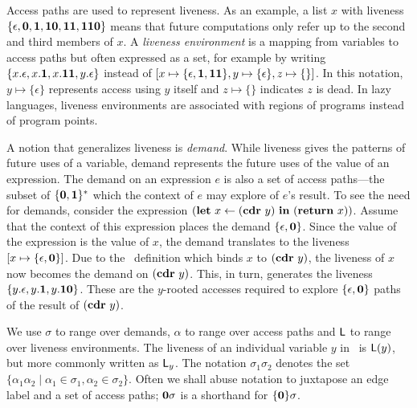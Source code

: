 \documentclass[9pt,nonatbib]{sigplanconf}
\begin{document}
Access paths are used to  represent liveness. As an example, a list
$x$ with 
liveness  $\{\epsilon,  \mathbf{0},  \mathbf{1},  \mathbf{1}\mathbf{0},
\mathbf{1}\mathbf{1},  \mathbf{1}\mathbf{1}\mathbf{0}\}$ means that future computations    only
refer up  to the  second and  third members of  $x$.  A  {\em liveness
  environment} is a mapping from  variables to access paths but often
expressed as  a set,  for example  by writing  $\{x.\epsilon, x.\mathbf{1},
x.\mathbf{1}\mathbf{1},        y.\epsilon\}$        instead        of        $[x
  \mapsto\{\epsilon,\mathbf{1},\mathbf{1}\mathbf{1}\},          y\mapsto\{\epsilon\},
  z\mapsto\{\}]$.    In  this   notation,  $y   \mapsto  \{\epsilon\}$
represents access using $y$ itself and $z \mapsto \{\}$ indicates 
$z$ is dead.  In lazy  languages, liveness environments are associated
with regions of programs instead of program points.

A notion  that generalizes liveness  is {\em demand}.   While liveness
gives the patterns of future uses of a variable, demand represents the
future uses of the value of an expression.  The demand on an expression
$e$   is   also   a   set    of   access   paths---the   subset   of
$\{\mathbf{0},\mathbf{1}\}^\ast$ which the  context of $e$ may  explore of $e$'s
result.   To see  the need  for demands,  consider the expression
$(\mbox{$\mathbf{ let}$}~x\leftarrow  (\mbox{$\mathbf{cdr}$}~y)~\mbox{$\mathbf{ in}$}~   (\mbox{$\mathbf{ return}$}~x))$.   Assume   that  the
context of this expression places  the demand $\lbrace \epsilon, \mathbf{0}
\rbrace$. Since the  value of the expression is the  value of $x$, the
demand translates to the liveness  $[x \mapsto \lbrace \epsilon, \mathbf{0}
  \rbrace]$.   Due  to  the  \LET\   definition  which  binds  $x$  to
$(\mbox{$\mathbf{cdr}$}~y)$, the liveness of $x$  now becomes the demand on $(\mbox{$\mathbf{cdr}$}~y)$.
This, in  turn, generates  the liveness $\lbrace  y.\epsilon, y.\mathbf{1},
y.\mathbf{1}\mathbf{0}  \rbrace$.   These are  the $y$-rooted  accesses
required to  explore $\lbrace  \epsilon, \mathbf{0}  \rbrace$ paths  of the
result of $(\mbox{$\mathbf{cdr}$}~y)$.
  
We use $\sigma$  to range over demands, $\alpha$ to  range over access
paths and $\mathsf{L}$  to range over liveness environments.  The liveness of
an  individual variable  $y$ in  \Lv\  is $\mathsf{L}(y)$,  but more  commonly
written as  $\mathsf{L}_y$.  The notation $\sigma_1\sigma_2$  denotes the set
$\lbrace  \alpha_1\alpha_2 \mid  \alpha_1 \in  \sigma_1, \alpha_2  \in
\sigma_2\rbrace$.  Often we shall abuse  notation to juxtapose an edge
label and  a set  of access  paths; $\mathbf{0}\sigma$  is a  shorthand for
$\lbrace\mathbf{0}\rbrace\sigma$.
\end{document}
